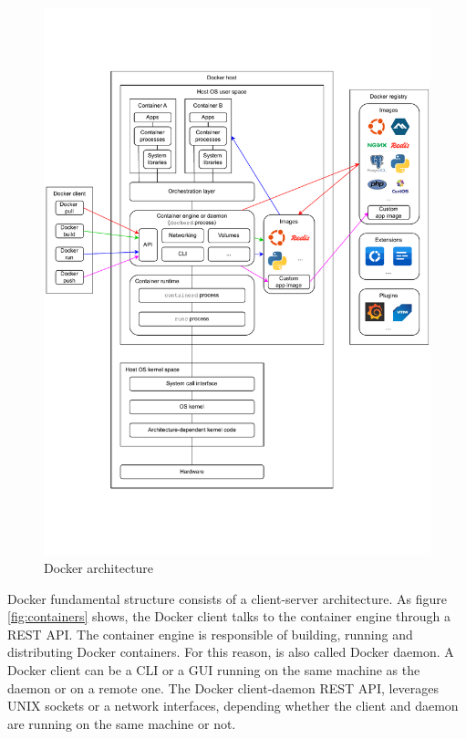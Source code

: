 \begin{figure}[htbp]
    \centering
    \includegraphics[width=1\textwidth]{assets/docker.pdf}
    \caption{Docker architecture}
    \label{fig:docker_architecture}
\end{figure}

Docker fundamental structure consists of a client-server architecture. 
As figure \ref{fig:containers} shows, the Docker client talks to the container engine through a REST API. The container engine is responsible of building, running and distributing Docker containers. For this reason, is also called Docker daemon.
A Docker client can be a CLI or a GUI running on the same machine as the daemon or on a remote one.
The Docker client-daemon REST API, leverages UNIX sockets or a network interfaces, depending whether the client and daemon are running on the same machine or not.

